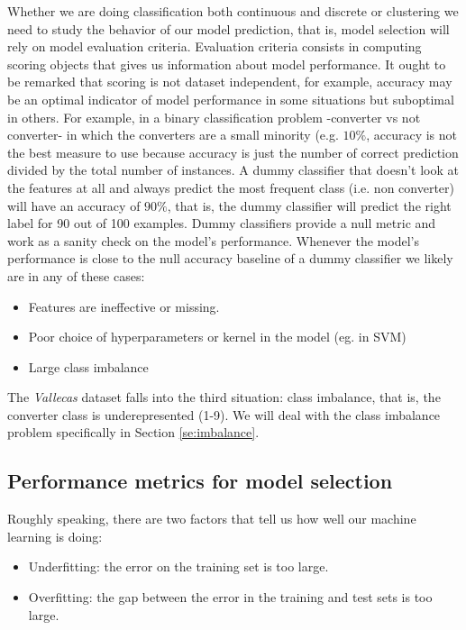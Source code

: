 \documentclass[11pt]{article}
\theoremstyle{definition}
\theoremstyle{remark}
\begin{document}
Whether we are doing classification both continuous and discrete or clustering we need to study the behavior of our model prediction, that is, model selection will rely on model evaluation criteria. Evaluation criteria consists in computing scoring objects that gives us information about model performance. It ought to be remarked that scoring is not dataset independent, for example, accuracy may be an optimal indicator of model performance in some situations but suboptimal in others. For example, in a binary classification problem -converter vs not converter- in which the converters are a small minority (e.g. $10\%$, accuracy is not the best measure to use because accuracy is just the number of correct prediction divided by the total number of instances. A dummy classifier that doesn't look at the features at all and always predict the most frequent class (i.e. non converter) will have an accuracy of $90\%$, that is, the dummy classifier will predict the right label for 90 out of 100 examples. 
Dummy classifiers provide a null metric and work as a sanity check on the model's performance. Whenever the model's performance is close to the null accuracy baseline of a dummy classifier we likely are in any of these cases:
\begin{itemize}
	\item Features are ineffective or missing.
	\item Poor choice of hyperparameters or kernel in the model (eg. in SVM) 
	\item Large class imbalance 
\end{itemize}

The \emph{Vallecas} dataset falls into the third situation: class imbalance, that is, the converter class is underepresented (1-9). We will deal with the class imbalance problem specifically in Section \ref{se:imbalance}.


\subsection{Performance metrics for model selection}
\label{sse:permets}
Roughly speaking, there are two factors that tell us how well our machine learning is doing:
\begin{itemize}
\item Underfitting: the error on the training set is too large.
\item Overfitting: the gap between the error in the training and test sets is too large. 
\end{itemize}
\end{document}
